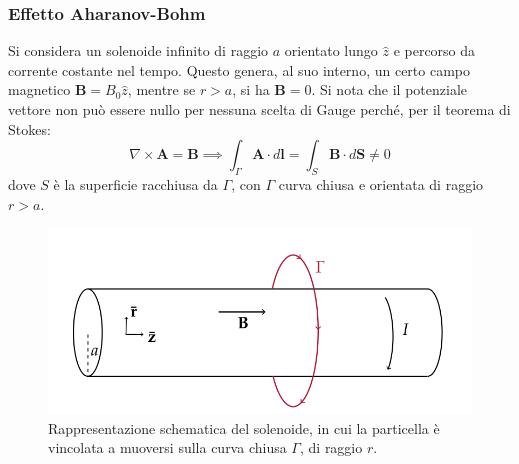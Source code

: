 \documentclass[11pt, a4paper]{scrartcl} %
\numberwithin{equation}{subsection}
\theoremstyle{style2}
\theoremstyle{style1}
\begin{document}
\subsubsection{Effetto Aharanov-Bohm}
Si considera un solenoide infinito di raggio $a$ orientato lungo $\hat{z}$ e percorso da corrente costante nel tempo.
Questo genera, al suo interno, un certo campo magnetico $\mathbf{B} = B_0 \hat{z}$, mentre se $r > a$, si ha $\mathbf{B} = 0$.
Si nota che il potenziale vettore non pu\`o essere nullo per nessuna scelta di Gauge perch\'e, per il teorema di Stokes:
\[
\nabla \times \mathbf{A}  = \mathbf{B}  \implies \int_{\Gamma} \mathbf{A} \cdot d\mathbf{l} = \int_{S} \mathbf{B} \cdot d\mathbf{S} \neq 0
\] 
dove $S$ \`e la superficie racchiusa da $\Gamma$, con $\Gamma$ curva chiusa e orientata di raggio $r > a$.
\begin{figure}[h!]
	\centering
	\includegraphics[width=.8\columnwidth]{sol.png}
	\caption{Rappresentazione schematica del solenoide, in cui la particella \`e vincolata a muoversi sulla curva chiusa $\Gamma$, di raggio $r$.}
\end{figure}
\end{document}
